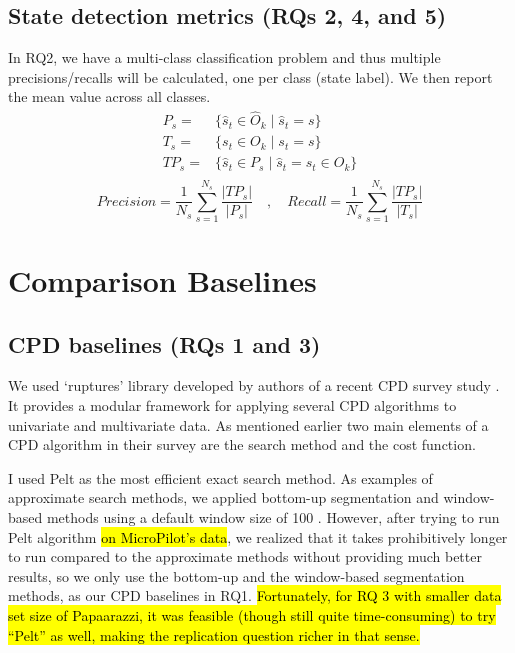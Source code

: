 \subsection{State detection metrics (RQs 2, 4, and 5)}
In RQ2, we have a multi-class classification problem and thus multiple precisions/recalls will be calculated, one per class (state label). We then report the mean value across all classes. 
\begin{equation}
\begin{split}
P_s ={}&{}\big\{\hat{s}_t \in \hat{O}_k \;\big|\; \hat{s}_t = s\big\} \\
T_s ={}&{}\big\{s_t \in O_k \;\big|\; s_t = s\big\} \\
TP_s ={}&{}\big\{\hat{s}_t \in P_s \;\big|\; \hat{s}_t = s_t \in O_k\big\} \\
\end{split}
\end{equation}
$$Precision =\frac{1}{N_s}\sum_{s=1}^{N_s} \frac{|TP_s|}{|P_s|} \quad,\quad Recall = \frac{1}{N_s}\sum_{s=1}^{N_s} \frac{|TP_s|}{|T_s|}$$

\section{Comparison Baselines} 
\subsection{CPD baselines (RQs 1 and 3)} \label{sec:CPD_baseline}
We used `ruptures' library developed by authors of a recent CPD survey study \cite{Truong2018ChangePointSurvey}. It provides a modular framework for applying several CPD algorithms to univariate and multivariate data. %
As mentioned earlier two main elements of a CPD algorithm in their survey are the search method and the cost function.

I used Pelt \cite{killick2012optimal} as the most efficient exact search method. As examples of approximate search methods, we applied bottom-up segmentation and window-based methods using a default window size of 100 \cite{keogh2001online}.
However, after trying to run Pelt algorithm \hl{on MicroPilot's data}, we realized that it takes prohibitively longer to run compared to the approximate methods without providing much better results, so we only use the bottom-up and the window-based segmentation methods, as our CPD baselines in RQ1.
\hl{Fortunately, for RQ 3 with smaller data set size of Papaarazzi, it was feasible (though still quite time-consuming) to try ``Pelt'' as well, making the replication question richer in that sense.}


